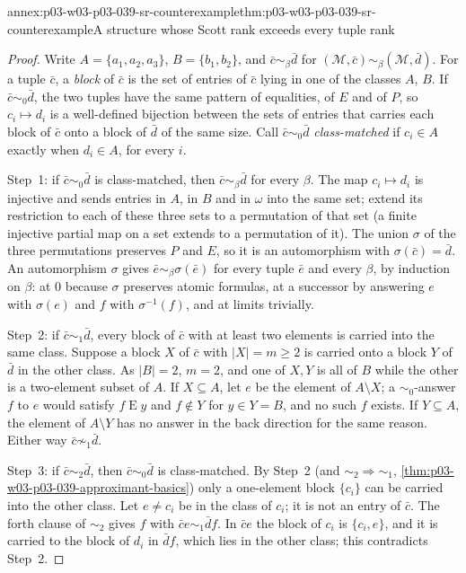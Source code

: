 \begin{annexitem}{annex:p03-w03-p03-039-sr-counterexample}{thm:p03-w03-p03-039-sr-counterexample}{A structure whose Scott rank exceeds every tuple rank}
\begin{proof}
Write \(A=\{a_1,a_2,a_3\}\), \(B=\{b_1,b_2\}\), and \(\bar c\sim_\beta\bar d\)
for \((\mathcal M,\bar c)\sim_\beta(\mathcal M,\bar d)\). For a tuple
\(\bar c\), a \emph{block} of \(\bar c\) is the set of entries of \(\bar c\)
lying in one of the classes \(A\), \(B\). If \(\bar c\sim_0\bar d\), the two
tuples have the same pattern of equalities, of \(E\) and of \(P\), so
\(c_i\mapsto d_i\) is a well-defined bijection between the sets of entries
that carries each block of \(\bar c\) onto a block of \(\bar d\) of the same
size. Call \(\bar c\sim_0\bar d\) \emph{class-matched} if \(c_i\in A\)
exactly when \(d_i\in A\), for every \(i\).

Step~1: if \(\bar c\sim_0\bar d\) is class-matched, then \(\bar c\sim_\beta\bar d\)
for every \(\beta\). The map \(c_i\mapsto d_i\) is injective and sends entries
in \(A\), in \(B\) and in \(\omega\) into the same set; extend its restriction
to each of these three sets to a permutation of that set (a finite injective
partial map on a set extends to a permutation of it). The union \(\sigma\) of
the three permutations preserves \(P\) and \(E\), so it is an automorphism
with \(\sigma(\bar c)=\bar d\). An automorphism \(\sigma\) gives
\(\bar e\sim_\beta\sigma(\bar e)\) for every tuple \(\bar e\) and every
\(\beta\), by induction on \(\beta\): at \(0\) because \(\sigma\) preserves
atomic formulas, at a successor by answering \(e\) with \(\sigma(e)\) and
\(f\) with \(\sigma^{-1}(f)\), and at limits trivially.

Step~2: if \(\bar c\sim_1\bar d\), every block of \(\bar c\) with at least
two elements is carried into the same class. Suppose a block \(X\) of
\(\bar c\) with \(\lvert X\rvert=m\ge2\) is carried onto a block \(Y\) of
\(\bar d\) in the other class. As \(\lvert B\rvert=2\), \(m=2\), and one of
\(X,Y\) is all of \(B\) while the other is a two-element subset of \(A\).
If \(X\subseteq A\), let \(e\) be the element of \(A\setminus X\); a
\(\sim_0\)-answer \(f\) to \(e\) would satisfy \(f\mathrel E y\) and
\(f\notin Y\) for \(y\in Y=B\), and no such \(f\) exists. If \(Y\subseteq A\),
the element of \(A\setminus Y\) has no answer in the back direction for the
same reason. Either way \(\bar c\not\sim_1\bar d\).

Step~3: if \(\bar c\sim_2\bar d\), then \(\bar c\sim_0\bar d\) is
class-matched. By Step~2 (and \(\sim_2\Rightarrow\sim_1\),
\cref{thm:p03-w03-p03-039-approximant-basics}) only a one-element block
\(\{c_i\}\) can be carried into the other class. Let \(e\ne c_i\) be in the
class of \(c_i\); it is not an entry of \(\bar c\). The forth clause of
\(\sim_2\) gives \(f\) with \(\bar ce\sim_1\bar df\). In \(\bar ce\) the
block of \(c_i\) is \(\{c_i,e\}\), and it is carried to the block of \(d_i\)
in \(\bar df\), which lies in the other class; this contradicts Step~2.


\end{proof}
\end{annexitem}
